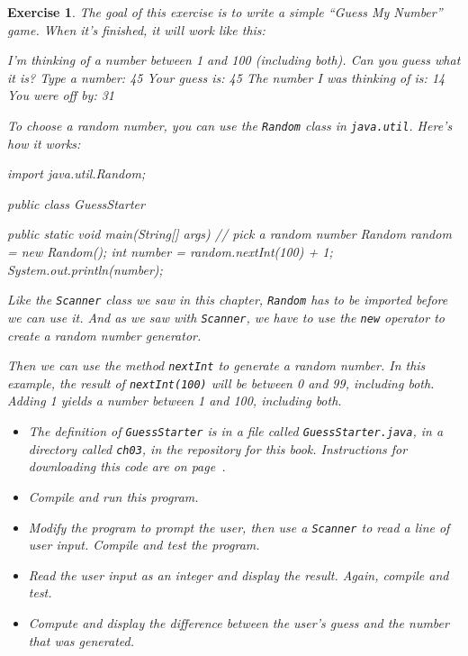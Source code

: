 \documentclass[12pt]{book}
\theoremstyle{exercise}
\newtheorem{exercise}{Exercise}[chapter]
\newcommand{\java}[1]{\verb"#1"}
\begin{document}
\begin{exercise}
\label{guess}
The goal of this exercise is to write a simple ``Guess My Number'' game.
When it's finished, it will work like this:

\begin{stdout}
I'm thinking of a number between 1 and 100
(including both). Can you guess what it is?
Type a number: 45
Your guess is: 45
The number I was thinking of is: 14
You were off by: 31
\end{stdout}

To choose a random number, you can use the \java{Random} class in \java{java.util}.
Here's how it works:

\begin{code}
import java.util.Random;

public class GuessStarter {

    public static void main(String[] args) {
        // pick a random number
        Random random = new Random();
        int number = random.nextInt(100) + 1;
        System.out.println(number);
    }
}
\end{code}

Like the \java{Scanner} class we saw in this chapter, \java{Random} has to be imported before we can use it.
And as we saw with \java{Scanner}, we have to use the \java{new} operator to create a random number generator.

Then we can use the method \java{nextInt} to generate a random number.
In this example, the result of \java{nextInt(100)} will be between 0 and 99, including both.
Adding 1 yields a number between 1 and 100, including both.

\begin{itemize}

\item The definition of \java{GuessStarter} is in a file called {\tt GuessStarter.java}, in a directory called {\tt ch03}, in the repository for this book.
Instructions for downloading this code are on page~\pageref{code}.

\item Compile and run this program.

\item Modify the program to prompt the user, then use a \java{Scanner} to read a line of user input.
Compile and test the program.

\item Read the user input as an integer and display the result.
Again, compile and test.

\item Compute and display the difference between the user's guess and the number that was generated.

\end{itemize}

\end{exercise}
\end{document}
